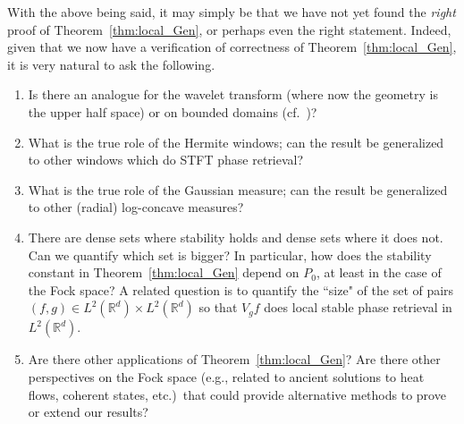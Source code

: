 \documentclass[11pt]{amsart}
\theoremstyle{remark}
\begin{document}
With the above being said, it may simply be that we have not yet found the \emph{right} proof of Theorem~\ref{thm:local_Gen}, or perhaps even the right statement. Indeed, given that we now have a verification of correctness of Theorem~\ref{thm:local_Gen}, it is very natural to ask the following.

\begin{enumerate}
    \item Is there an analogue for the wavelet transform (where now the geometry is the upper half space) or on bounded domains (cf.~\cite{alaifari2019Stable,alaifari2025cheeger})?
    \item What is the true role of the Hermite windows; can the result be generalized to other windows which do STFT phase retrieval?
    \item What is the true role of the Gaussian measure; can the result be generalized to other (radial) log-concave measures?
    \item  There are dense sets where stability holds and dense sets where it does not. Can we quantify which set is bigger? In particular, how does the stability constant in Theorem~\ref{thm:local_Gen} depend on $P_0$, at least in the case of the Fock space? A related question is to quantify the ``size" of the set of pairs $(f,g)\in L^2(\mathbb{R}^d)\times L^2(\mathbb{R}^d)$ so that $V_gf$ does local stable phase retrieval in $L^2(\mathbb{R}^d)$.
\item Are there other applications of Theorem~\ref{thm:local_Gen}? Are there other perspectives on the Fock space (e.g., related to ancient solutions to heat flows, coherent states, etc.)~that could provide alternative methods to prove or extend our results?

\end{enumerate}
\end{document}
